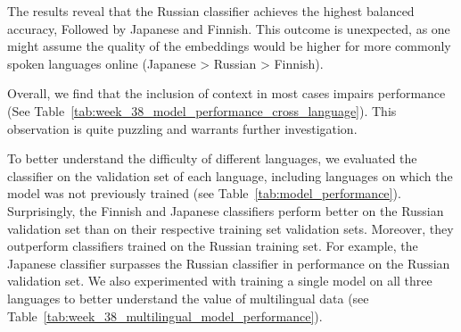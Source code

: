\documentclass[11pt]{article}
\begin{document}
\begin{table}[ht]
    \centering
    \caption{Model performance for language-specific training and cross-language evaluation, with and without context}
    \label{tab:model_performance_cross_language}
\end{table}

The results reveal that the Russian classifier achieves the highest balanced accuracy, Followed by Japanese and Finnish.
This outcome is unexpected, as one might assume the quality of the embeddings would be higher for more commonly spoken languages online (Japanese > Russian > Finnish). 

Overall, we find that the inclusion of context in most cases impairs performance (See Table~\ref{tab:week_38_model_performance_cross_language}). This observation is quite puzzling and warrants further investigation.

To better understand the difficulty of different languages, we evaluated the classifier on the validation set of each language, including languages on which the model was not previously trained (see Table~\ref{tab:model_performance}).
Surprisingly, the Finnish and Japanese classifiers perform better on the Russian validation set than on their respective training set validation sets. Moreover, they outperform classifiers trained on the Russian training set.
For example, the Japanese classifier surpasses the Russian classifier in performance on the Russian validation set.
We also experimented with training a single model on all three languages to better understand the value of multilingual data (see Table~\ref{tab:week_38_multilingual_model_performance}).
\end{document}

